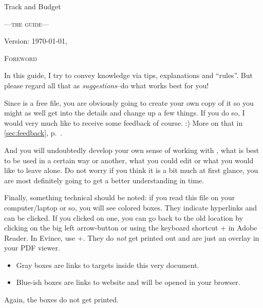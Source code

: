
\begin{center}\LARGE
Track and Budget
\end{center}
\begin{center}\scshape\large\sffamily
	---the guide---
\end{center}

\vfill
\begin{center}
Version: \today, \thistime
\end{center}

\clearpage
\begin{center}\large\scshape
	Foreword
\end{center}
In this guide, I try to convey knowledge via tips, explanations and ``rules''.
But please regard all that as \emph{suggestions}--do what works best for you!

Since \tfn is a free file, you are obviously going to create your own copy of it so you might as well get into the details and change up a few things.
If you do so, I would very much like to receive some feedback of course. :)
More on that in \autoref{sec:feedback}, p.~\pageref{sec:feedback}.

And you will undoubtedly develop your own sense of working with \tfn, what is best to be used in a certain way or another, what you could edit or what you would like to leave alone.
Do not worry if you think it is a bit much at first glance, you are most definitely going to get a better understanding in time.

Finally, something technical should be noted: if you read this file on your computer/laptop or so, you will see colored boxes.
They indicate hyperlinks and can be clicked.
If you clicked on one, you can go back to the old location by clicking on the big left arrow-button or using the keyboard shortcut +\keystroke{\( \leftarrow \)}  in Adobe Reader.
In Evince, use +.
They do \emph{not} get printed out and are just an overlay in your PDF viewer.
\begin{itemize}
	\item Gray boxes are links to targets inside this very document.
	\item Blue-ish boxes are links to website and will be opened in your browser.
\end{itemize}
Again, the boxes do not get printed.
